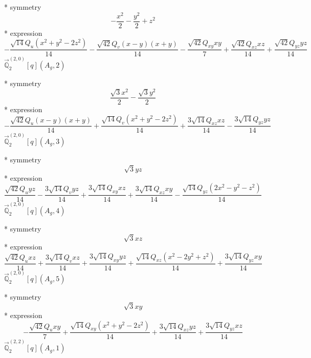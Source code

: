 \documentclass[fleqn,8pt]{jsarticle}
\begin{document}
\noindent\quad ** symmetry
\begin{dmath*}
- \frac{x^{2}}{2} - \frac{y^{2}}{2} + z^{2}
\end{dmath*}
\noindent\quad ** expression
\begin{dmath*}
- \frac{\sqrt{14} Q_{u} \left(x^{2} + y^{2} - 2 z^{2}\right)}{14} - \frac{\sqrt{42} Q_{v} \left(x - y\right) \left(x + y\right)}{14} - \frac{\sqrt{42} Q_{xy} x y}{7} + \frac{\sqrt{42} Q_{xz} x z}{14} + \frac{\sqrt{42} Q_{yz} y z}{14}
\end{dmath*}
\noindent\quad $\vec{\mathbb{Q}}_{2}^{(2,0)}[q](A_{g},2)$

\noindent\quad ** symmetry
\begin{dmath*}
\frac{\sqrt{3} x^{2}}{2} - \frac{\sqrt{3} y^{2}}{2}
\end{dmath*}
\noindent\quad ** expression
\begin{dmath*}
- \frac{\sqrt{42} Q_{u} \left(x - y\right) \left(x + y\right)}{14} + \frac{\sqrt{14} Q_{v} \left(x^{2} + y^{2} - 2 z^{2}\right)}{14} + \frac{3 \sqrt{14} Q_{xz} x z}{14} - \frac{3 \sqrt{14} Q_{yz} y z}{14}
\end{dmath*}
\noindent\quad $\vec{\mathbb{Q}}_{2}^{(2,0)}[q](A_{g},3)$

\noindent\quad ** symmetry
\begin{dmath*}
\sqrt{3} y z
\end{dmath*}
\noindent\quad ** expression
\begin{dmath*}
\frac{\sqrt{42} Q_{u} y z}{14} - \frac{3 \sqrt{14} Q_{v} y z}{14} + \frac{3 \sqrt{14} Q_{xy} x z}{14} + \frac{3 \sqrt{14} Q_{xz} x y}{14} - \frac{\sqrt{14} Q_{yz} \left(2 x^{2} - y^{2} - z^{2}\right)}{14}
\end{dmath*}
\noindent\quad $\vec{\mathbb{Q}}_{2}^{(2,0)}[q](A_{g},4)$

\noindent\quad ** symmetry
\begin{dmath*}
\sqrt{3} x z
\end{dmath*}
\noindent\quad ** expression
\begin{dmath*}
\frac{\sqrt{42} Q_{u} x z}{14} + \frac{3 \sqrt{14} Q_{v} x z}{14} + \frac{3 \sqrt{14} Q_{xy} y z}{14} + \frac{\sqrt{14} Q_{xz} \left(x^{2} - 2 y^{2} + z^{2}\right)}{14} + \frac{3 \sqrt{14} Q_{yz} x y}{14}
\end{dmath*}
\noindent\quad $\vec{\mathbb{Q}}_{2}^{(2,0)}[q](A_{g},5)$

\noindent\quad ** symmetry
\begin{dmath*}
\sqrt{3} x y
\end{dmath*}
\noindent\quad ** expression
\begin{dmath*}
- \frac{\sqrt{42} Q_{u} x y}{7} + \frac{\sqrt{14} Q_{xy} \left(x^{2} + y^{2} - 2 z^{2}\right)}{14} + \frac{3 \sqrt{14} Q_{xz} y z}{14} + \frac{3 \sqrt{14} Q_{yz} x z}{14}
\end{dmath*}
\noindent\quad $\vec{\mathbb{Q}}_{2}^{(2,2)}[q](A_{g},1)$
\end{document}
